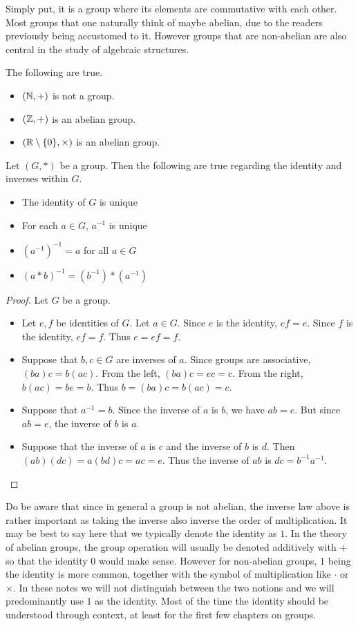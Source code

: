 \documentclass[a4paper]{article}
\begin{document}
Simply put, it is a group where its elements are commutative with each other. Most groups that one naturally think of maybe abelian, due to the readers previously being accustomed to it. However groups that are non-abelian are also central in the study of algebraic structures. 

\begin{eg}{}{} The following are true. 
\begin{itemize}
\item $(\mathbb{N},+)$ is not a group. 
\item $(\mathbb{Z},+)$ is an abelian group. 
\item $(\mathbb{R}\setminus\{0\},\times)$ is an abelian group. 
\end{itemize}
\end{eg}

\begin{lmm}{}{} Let $(G,\ast)$ be a group. Then the following are true regarding the identity and inverses within $G$. 
\begin{itemize}
\item The identity of $G$ is unique
\item For each $a\in G$, $a^{-1}$ is unique
\item $(a^{-1})^{-1}=a$ for all $a\in G$
\item $(a\ast b)^{-1}=(b^{-1})\ast(a^{-1})$
\end{itemize}
\begin{proof} Let $G$ be a group. 
\begin{itemize}
\item Let $e,f$ be identities of $G$. Let $a\in G$. Since $e$ is the identity, $ef=e$. Since $f$ is the identity, $ef=f$. Thus $e=ef=f$. 
\item Suppose that $b,c\in G$ are inverses of $a$. Since groups are associative, $(ba)c=b(ac)$. From the left, $(ba)c=ec=c$. From the right, $b(ac)=be=b$. Thus $b=(ba)c=b(ac)=c$. 
\item Suppose that $a^{-1}=b$. Since the inverse of $a$ is $b$, we have $ab=e$. But since $ab=e$, the inverse of $b$ is $a$. 
\item Suppose that the inverse of $a$ is $c$ and the inverse of $b$ is $d$. Then $(ab)(dc)=a(bd)c=ac=e$. Thus the inverse of $ab$ is $dc=b^{-1}a^{-1}$. 
\end{itemize}
\end{proof}
\end{lmm}

Do be aware that since in general a group is not abelian, the inverse law above is rather important as taking the inverse also inverse the order of multiplication. It may be best to say here that we typically denote the identity as $1$. In the theory of abelian groups, the group operation will usually be denoted additively with $+$ so that the identity $0$ would make sense. However for non-abelian groups, $1$ being the identity is more common, together with the symbol of multiplication like $\cdot$ or $\times$. In these notes we will not distinguish between the two notions and we will predominantly use $1$ as the identity. Most of the time the identity should be understood through context, at least for the first few chapters on groups. \\
\end{document}
